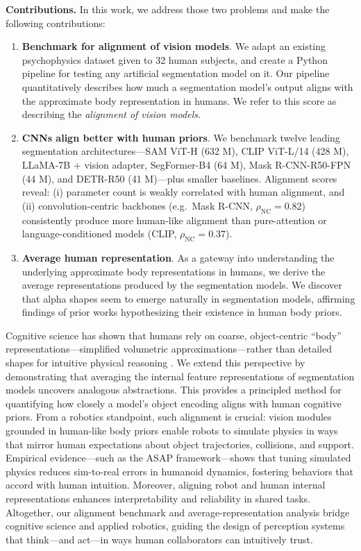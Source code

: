 \documentclass[letterpaper]{article} %
\begin{document}
\noindent \textbf{Contributions.} In this work, we address those two problems and make the following contributions:

\begin{enumerate}
    \item \textbf{Benchmark for alignment of vision models}.  
          We adapt an existing psychophysics dataset given to 32 human subjects, and create a Python pipeline for testing any artificial segmentation model on it. Our pipeline quantitatively describes how much a segmentation model's output aligns with the approximate body representation in humans. We refer to this score as describing the \textit{alignment of vision models}. \tex
    \item \textbf{CNNs align better with human priors}.
          We benchmark twelve leading segmentation architectures—SAM ViT-H (632 M), CLIP ViT-L/14 (428 M), LLaMA-7B + vision adapter, SegFormer-B4 (64 M), Mask R-CNN-R50-FPN (44 M), and DETR-R50 (41 M)—plus smaller baselines.  
          Alignment scores reveal: (i) parameter count is weakly correlated with human alignment, and (ii) convolution-centric backbones (e.g.\ Mask R-CNN, \(\rho_{\text{NC}}\!=0.82\)) consistently produce more human-like alignment than pure-attention or language-conditioned models (CLIP, \(\rho_{\text{NC}}\!=0.37\)).
    \item \textbf{Average human representation}.
          As a gateway into understanding the underlying approximate body representations in humans, we derive the average representations produced by the segmentation models. We discover that alpha shapes seem to emerge naturally in segmentation models, affirming findings of prior works hypothesizing their existence in human body priors.
\end{enumerate}

Cognitive science has shown that humans rely on coarse, object-centric “body” representations—simplified volumetric approximations—rather than detailed shapes for intuitive physical reasoning \cite{li2023approximate, spelke1990principles, baillargeon2004infant}. We extend this perspective by demonstrating that averaging the internal feature representations of segmentation models uncovers analogous abstractions. This provides a principled method for quantifying how closely a model’s object encoding aligns with human cognitive priors. From a robotics standpoint, such alignment is crucial: vision modules grounded in human-like body priors enable robots to simulate physics in ways that mirror human expectations about object trajectories, collisions, and support. Empirical evidence—such as the ASAP framework—shows that tuning simulated physics reduces sim-to-real errors in humanoid dynamics, fostering behaviors that accord with human intuition. Moreover, aligning robot and human internal representations enhances interpretability and reliability in shared tasks. Altogether, our alignment benchmark and average-representation analysis bridge cognitive science and applied robotics, guiding the design of perception systems that think—and act—in ways human collaborators can intuitively trust.
\end{document}
